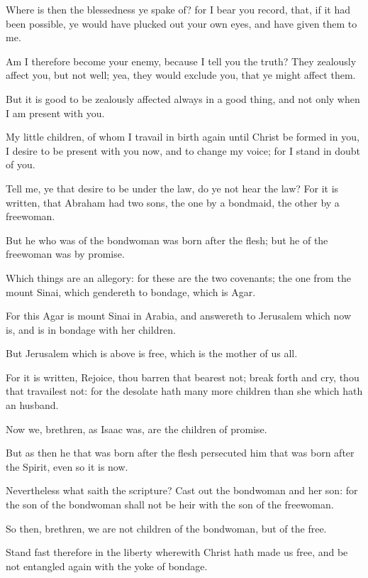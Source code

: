 \Verse Where is then the blessedness ye spake of? for I bear you record, that, if it had been possible, ye would have plucked out your own eyes, and have given them to me.

\Verse Am I therefore become your enemy, because I tell you the truth?  \Verse They zealously affect you, but not well; yea, they would exclude you, that ye might affect them.

\Verse But it is good to be zealously affected always in a good thing, and not only when I am present with you.

\Verse My little children, of whom I travail in birth again until Christ be formed in you, \Verse I desire to be present with you now, and to change my voice; for I stand in doubt of you.

\Verse Tell me, ye that desire to be under the law, do ye not hear the law?  \Verse For it is written, that Abraham had two sons, the one by a bondmaid, the other by a freewoman.

\Verse But he who was of the bondwoman was born after the flesh; but he of the freewoman was by promise.

\Verse Which things are an allegory: for these are the two covenants; the one from the mount Sinai, which gendereth to bondage, which is Agar.

\Verse For this Agar is mount Sinai in Arabia, and answereth to Jerusalem which now is, and is in bondage with her children.

\Verse But Jerusalem which is above is free, which is the mother of us all.

\Verse For it is written, Rejoice, thou barren that bearest not; break forth and cry, thou that travailest not: for the desolate hath many more children than she which hath an husband.

\Verse Now we, brethren, as Isaac was, are the children of promise.

\Verse But as then he that was born after the flesh persecuted him that was born after the Spirit, even so it is now.

\Verse Nevertheless what saith the scripture? Cast out the bondwoman and her son: for the son of the bondwoman shall not be heir with the son of the freewoman.

\Verse So then, brethren, we are not children of the bondwoman, but of the free.


\Chapter
\Verse Stand fast therefore in the liberty wherewith Christ hath made us free, and be not entangled again with the yoke of bondage.

